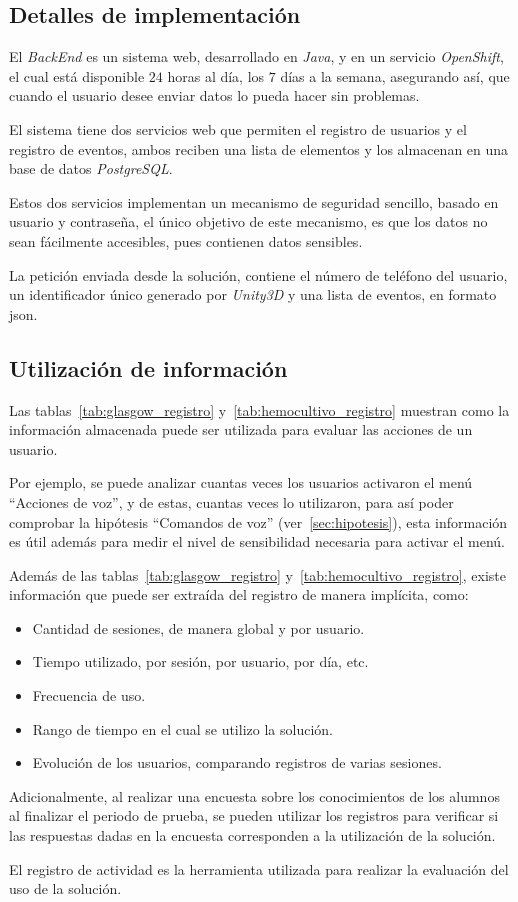 \subsection{Detalles de implementación}

El \textit{BackEnd} es un sistema web, desarrollado en \textit{Java}, y
 en un servicio \textit{OpenShift}, el cual está
disponible $24$ horas al día, los $7$ días a la semana, asegurando así, que
cuando el usuario desee enviar datos lo pueda hacer sin problemas.

El sistema tiene dos servicios web que permiten el registro de usuarios y el
registro de eventos, ambos reciben una lista de elementos y los almacenan en una
base de datos \textit{PostgreSQL}.

Estos dos servicios implementan un mecanismo de seguridad sencillo, basado en
usuario y contraseña, el único objetivo de este mecanismo, es que los datos no
sean fácilmente accesibles, pues contienen datos sensibles.

La petición enviada desde la solución, contiene el número de teléfono del
usuario, un identificador único generado por \textit{Unity3D} y una lista de
eventos, en formato \Gls{json}.

\subsection{Utilización de información}

Las tablas~\ref{tab:glasgow_registro} y~\ref{tab:hemocultivo_registro} muestran
como la información almacenada puede ser utilizada para evaluar las acciones de
un usuario.

Por ejemplo, se puede analizar cuantas veces los usuarios activaron el menú
\enquote{Acciones de voz}, y de estas, cuantas veces lo utilizaron, para así
poder comprobar la hipótesis \enquote{Comandos de voz}
(ver~\ref{sec:hipotesis}), esta información es útil además para medir el
nivel de sensibilidad necesaria para activar el menú.

Además de las tablas~\ref{tab:glasgow_registro}
y~\ref{tab:hemocultivo_registro}, existe información que puede ser extraída del
registro de manera implícita, como:

\begin{itemize}
\item Cantidad de sesiones, de manera global y por usuario.
\item Tiempo utilizado, por sesión, por usuario, por día, etc.
\item Frecuencia de uso.
\item Rango de tiempo en el cual se utilizo la solución.
\item Evolución de los usuarios, comparando registros de varias sesiones.
\end{itemize}

Adicionalmente, al realizar una encuesta sobre los conocimientos de los alumnos
al finalizar el periodo de prueba, se pueden utilizar los registros para
verificar si las respuestas dadas en la encuesta corresponden a la utilización
de la solución.

El registro de actividad es la herramienta utilizada para realizar la evaluación
del uso de la solución.
